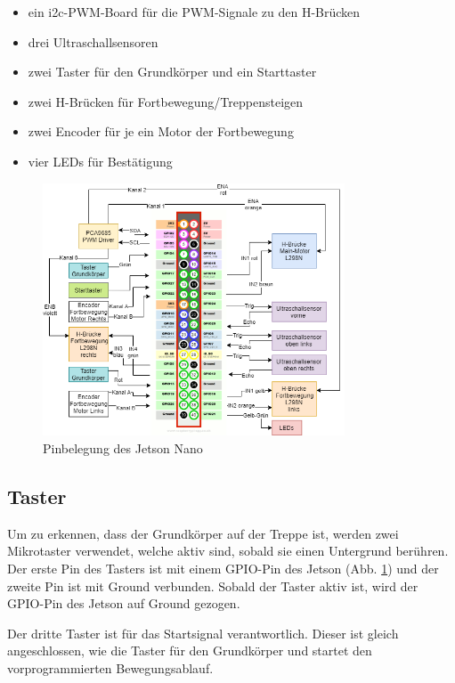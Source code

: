 \begin{itemize}
    \item ein \acrshort{i2c}-PWM-Board für die PWM-Signale zu den H-Brücken 
    \item drei Ultraschallsensoren
    \item zwei Taster für den Grundkörper und ein Starttaster
    \item zwei H-Brücken für Fortbewegung/Treppensteigen
    \item zwei Encoder für je ein Motor der Fortbewegung
    \item vier LEDs für Bestätigung
\end{itemize} 

\begin{figure}[H]
  \includegraphics[width=0.8\textwidth]{img/Elektronik/pinout.png}
  \centering
  \caption{Pinbelegung des Jetson Nano}
  \label{fig:pinout-jetson}
\end{figure}


\newpage

\subsection{Taster}

Um zu erkennen, dass der Grundkörper auf der Treppe ist, werden zwei Mikrotaster verwendet, welche aktiv sind, sobald sie einen Untergrund berühren. Der erste Pin des Tasters ist mit einem GPIO-Pin des Jetson (Abb. \ref{fig:pinout-jetson}) und der zweite Pin ist mit Ground verbunden. Sobald der Taster aktiv ist, wird der GPIO-Pin des Jetson auf Ground gezogen. 

Der dritte Taster ist für das Startsignal verantwortlich. Dieser ist gleich angeschlossen, wie die Taster für den Grundkörper und startet den vorprogrammierten Bewegungsablauf.


